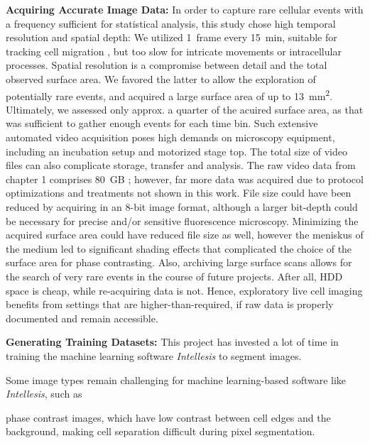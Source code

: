 \textbf{Acquiring Accurate Image Data:}
In order to capture rare cellular events with a frequency sufficient for
statistical analysis, this study chose high temporal resolution and spatial
depth: We utilized \SI{1}{frame} every \SI{15}{\minute}, suitable for tracking
cell migration \cite{huthSignificantlyImprovedPrecision2010}, but too slow for
intricate movements or intracellular processes. Spatial resolution is a
compromise between detail and the total observed surface area. We favored the
latter to allow the exploration of potentially rare events, and acquired a
 large surface area of up to
\SI{13}{\milli\meter\squared}. Ultimately, we assessed only approx. a quarter of
the acuired surface area, as that was sufficient to gather enough events for
each time bin. Such extensive automated video acquisition poses high demands on
microscopy equipment, including an incubation setup and motorized stage top. The
total size of video files can also complicate storage, transfer and analysis.
The raw video data from chapter 1 comprises \SI{80}{GB}
\cite{biostudiesBioStudiesEuropeanBioinformatics}; however, far more data was
acquired due to protocol optimizations and treatments not shown in this work.
File size could have been reduced by acquiring in an 8-bit image format,
although a larger bit-depth could be necessary for precise and/or sensitive
fluorescence microscopy. Minimizing the acquired surface area could have reduced
file size as well, however the meniskus of the medium led to significant shading
effects that complicated the choice of the surface area for phase contrasting.
Also, archiving large surface scans allows for the search of very rare events in
the course of future projects. After all, HDD space is cheap, while re-acquiring
data is not. Hence, exploratory live cell imaging benefits from settings that
are higher-than-required, if raw data is properly documented and remain
accessible.



\textbf{Generating Training Datasets:}
This project has invested a lot of time in training the machine learning
software \textit{Intellesis} to segment images.

Some image types remain challenging for machine learning-based software
like \textit{Intellesis}, such as

phase contrast images, which have low contrast
between cell edges and the background, making cell separation difficult during
pixel segmentation.

